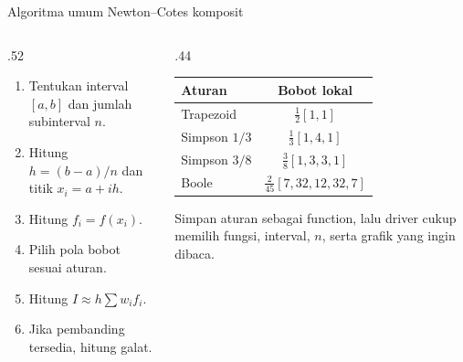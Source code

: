 \documentclass[aspectratio=169,10pt]{beamer}
\begin{document}
\begin{frame}{Algoritma umum Newton--Cotes komposit}
\scriptsize
\begin{columns}[T,totalwidth=\textwidth]
\begin{column}{.52\textwidth}
\begin{bluebox}
\begin{enumerate}\setlength\itemsep{3pt}
\item Tentukan interval $[a,b]$ dan jumlah subinterval $n$.
\item Hitung $h=(b-a)/n$ dan titik $x_i=a+ih$.
\item Hitung $f_i=f(x_i)$.
\item Pilih pola bobot sesuai aturan.
\item Hitung $I\approx h\sum w_i f_i$.
\item Jika pembanding tersedia, hitung galat.
\end{enumerate}
\end{bluebox}
\end{column}
\begin{column}{.44\textwidth}
\begin{orangebox}
\begin{tabular}{lc}
\toprule
Aturan & Bobot lokal\\\midrule
Trapezoid & $\frac12[1,1]$\\
Simpson $1/3$ & $\frac13[1,4,1]$\\
Simpson $3/8$ & $\frac38[1,3,3,1]$\\
Boole & $\frac{2}{45}[7,32,12,32,7]$\\
\bottomrule
\end{tabular}
\end{orangebox}
\begin{greenbox}
Simpan aturan sebagai function, lalu driver cukup memilih fungsi, interval, $n$, serta grafik yang ingin dibaca.
\end{greenbox}
\end{column}
\end{columns}
\end{frame}
\end{document}

